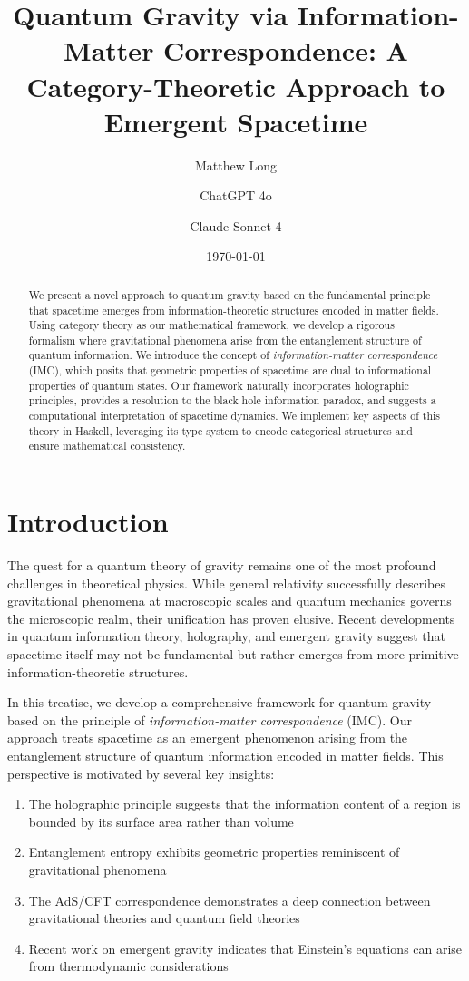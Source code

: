 \documentclass[12pt,a4paper]{article}
\title{Quantum Gravity via Information-Matter Correspondence: A Category-Theoretic Approach to Emergent Spacetime}
\author[1]{Matthew Long}
\author[2]{ChatGPT 4o}
\author[3]{Claude Sonnet 4}
\affil[1]{Yoneda AI}
\affil[2]{OpenAI}
\affil[3]{Anthropic}
\date{\today}
\begin{document}
\maketitle

\begin{abstract}
We present a novel approach to quantum gravity based on the fundamental principle that spacetime emerges from information-theoretic structures encoded in matter fields. Using category theory as our mathematical framework, we develop a rigorous formalism where gravitational phenomena arise from the entanglement structure of quantum information. We introduce the concept of \emph{information-matter correspondence} (IMC), which posits that geometric properties of spacetime are dual to informational properties of quantum states. Our framework naturally incorporates holographic principles, provides a resolution to the black hole information paradox, and suggests a computational interpretation of spacetime dynamics. We implement key aspects of this theory in Haskell, leveraging its type system to encode categorical structures and ensure mathematical consistency.
\end{abstract}

\tableofcontents
\newpage

\section{Introduction}

The quest for a quantum theory of gravity remains one of the most profound challenges in theoretical physics. While general relativity successfully describes gravitational phenomena at macroscopic scales and quantum mechanics governs the microscopic realm, their unification has proven elusive. Recent developments in quantum information theory, holography, and emergent gravity suggest that spacetime itself may not be fundamental but rather emerges from more primitive information-theoretic structures.

In this treatise, we develop a comprehensive framework for quantum gravity based on the principle of \emph{information-matter correspondence} (IMC). Our approach treats spacetime as an emergent phenomenon arising from the entanglement structure of quantum information encoded in matter fields. This perspective is motivated by several key insights:

\begin{enumerate}
\item The holographic principle suggests that the information content of a region is bounded by its surface area rather than volume
\item Entanglement entropy exhibits geometric properties reminiscent of gravitational phenomena
\item The AdS/CFT correspondence demonstrates a deep connection between gravitational theories and quantum field theories
\item Recent work on emergent gravity indicates that Einstein's equations can arise from thermodynamic considerations
\end{enumerate}
\end{document}
